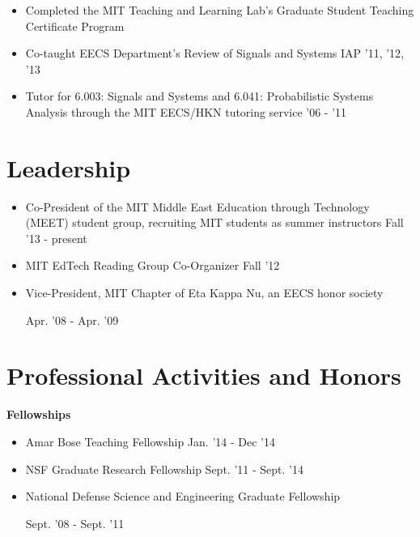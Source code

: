 \documentclass[margin]{res}
\begin{document}
\begin{resume}
\begin{itemize}
\item Completed the MIT Teaching and Learning Lab's Graduate Student Teaching Certificate Program
\item Co-taught EECS Department's Review of Signals and Systems \hfill IAP '11, '12, '13
\item Tutor for 6.003: Signals and Systems and 6.041: Probabilistic Systems Analysis through the MIT EECS/HKN tutoring service \hfill '06 - '11
\end{itemize}

\section{Leadership}
                \begin{itemize} \itemsep -2pt
                \item Co-President of the MIT Middle East Education through Technology (MEET) student group, recruiting MIT students as summer instructors \hfill Fall '13 - present
		\item MIT EdTech Reading Group Co-Organizer \hfill Fall '12 
                \item Vice-President, MIT Chapter of Eta Kappa Nu, an EECS honor society 
\begin{flushright}
Apr. '08 - Apr. '09
\end{flushright}      
\end{itemize}

\section{Professional Activities and Honors} 

               {\bf Fellowships}  
                \begin{itemize} \itemsep -2pt
\item Amar Bose Teaching Fellowship \hfill Jan. '14 - Dec '14
\item NSF Graduate Research Fellowship \hfill Sept. '11 - Sept. '14
              \item National Defense Science and Engineering Graduate Fellowship
\begin{flushright}
Sept. '08 - Sept. '11
\end{flushright}       
          

\end{itemize}
\end{resume}
\end{document}
